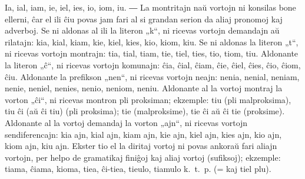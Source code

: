Ia, ial, iam, ie, iel, ies, io, iom, iu. ― La montritajn naŭ vortojn ni konsilas bone ellerni, ĉar el ili ĉiu povas jam fari al si grandan serion da aliaj pronomoj kaj adverboj. Se ni aldonas al ili la literon „k“, ni ricevas vortojn demandajn aŭ rilatajn: kia, kial, kiam, kie, kiel, kies, kio, kiom, kiu. Se ni aldonas la literon „t“, ni ricevas vortojn montrajn: tia, tial, tiam, tie, tiel, ties, tio, tiom, tiu. Aldonante la literon „ĉ“, ni ricevas vortojn komunajn: ĉia, ĉial, ĉiam, ĉie, ĉiel, ĉies, ĉio, ĉiom, ĉiu. Aldonante la prefikson „nen“, ni ricevas vortojn neajn: nenia, nenial, neniam, nenie, neniel, nenies, nenio, neniom, neniu. Aldonante al la vortoj montraj la vorton „ĉi“, ni ricevas montron pli proksiman; ekzemple: tiu (pli malproksima), tiu ĉi (aŭ ĉi tiu) (pli proksima); tie (malproksime), tie ĉi aŭ ĉi tie (proksime). Aldonante al la vortoj demandaj la vorton „ajn“, ni ricevas vortojn sendiferencajn: kia ajn, kial ajn, kiam ajn, kie ajn, kiel ajn, kies ajn, kio ajn, kiom ajn, kiu ajn. Ekster tio el la diritaj vortoj ni povas ankoraŭ fari aliajn vortojn, per helpo de gramatikaj finiĝoj kaj aliaj vortoj (sufiksoj); ekzemple: tiama, ĉiama, kioma, tiea, ĉi-tiea, tieulo, tiamulo k.~t.~p. (= kaj tiel plu).

